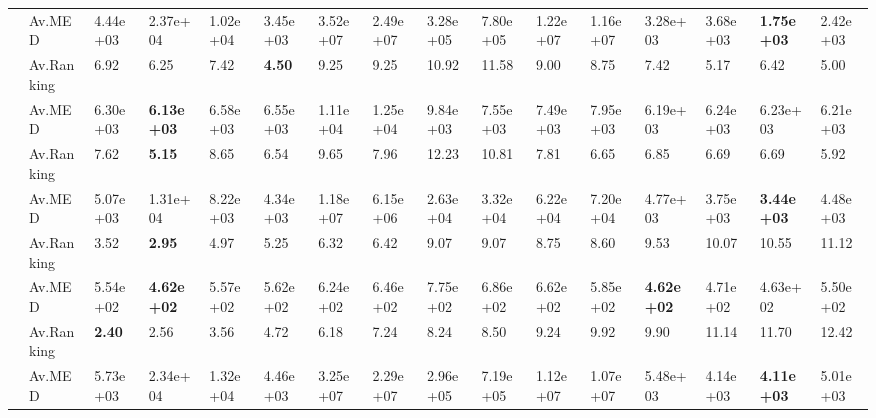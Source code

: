 \begin{ThreePartTable}
{\begin{longtable}{m{0.1cm} C{1.25cm} m{0.88cm} m{0.88cm} m{0.88cm} m{0.88cm} m{0.88cm} m{0.88cm} m{0.88cm} m{0.88cm} m{0.88cm} m{0.88cm} m{0.88cm} m{0.88cm} m{0.88cm} m{0.88cm}}
\midrule
 & Av.MED  & 4.44e+03 & 2.37e+04 & 1.02e+04 & 3.45e+03 & 3.52e+07 & 2.49e+07 & 3.28e+05 & 7.80e+05 & 1.22e+07 & 1.16e+07 & 3.28e+03 & 3.68e+03 & \textbf{1.75e+03} & 2.42e+03 \\
& Av.Ranking  & 6.92 & 6.25 & 7.42 & \textbf{4.50} & 9.25 & 9.25 & 10.92 & 11.58 & 9.00 & 8.75 & 7.42 & 5.17 & 6.42 & 5.00 \\
\midrule
 & Av.MED  & 6.30e+03 & \textbf{6.13e+03} & 6.58e+03 & 6.55e+03 & 1.11e+04 & 1.25e+04 & 9.84e+03 & 7.55e+03 & 7.49e+03 & 7.95e+03 & 6.19e+03 & 6.24e+03 & 6.23e+03 & 6.21e+03 \\
& Av.Ranking  & 7.62 & \textbf{5.15} & 8.65 & 6.54 & 9.65 & 7.96 & 12.23 & 10.81 & 7.81 & 6.65 & 6.85 & 6.69 & 6.69 & 5.92 \\
\midrule
 & Av.MED  & 5.07e+03 & 1.31e+04 & 8.22e+03 & 4.34e+03 & 1.18e+07 & 6.15e+06 & 2.63e+04 & 3.32e+04 & 6.22e+04 & 7.20e+04 & 4.77e+03 & 3.75e+03 & \textbf{3.44e+03} & 4.48e+03 \\
& Av.Ranking  & 3.52 & \textbf{2.95} & 4.97 & 5.25 & 6.32 & 6.42 & 9.07 & 9.07 & 8.75 & 8.60 & 9.53 & 10.07 & 10.55 & 11.12 \\
\midrule
 & Av.MED  & 5.54e+02 & \textbf{4.62e+02} & 5.57e+02 & 5.62e+02 & 6.24e+02 & 6.46e+02 & 7.75e+02 & 6.86e+02 & 6.62e+02 & 5.85e+02 & \textbf{4.62e+02} & 4.71e+02 & 4.63e+02 & 5.50e+02 \\
& Av.Ranking  & \textbf{2.40} & 2.56 & 3.56 & 4.72 & 6.18 & 7.24 & 8.24 & 8.50 & 9.24 & 9.92 & 9.90 & 11.14 & 11.70 & 12.42 \\\midrule
 & Av.MED  & 5.73e+03 & 2.34e+04 & 1.32e+04 & 4.46e+03 & 3.25e+07 & 2.29e+07 & 2.96e+05 & 7.19e+05 & 1.12e+07 & 1.07e+07 & 5.48e+03 & 4.14e+03 & \textbf{4.11e+03} & 5.01e+03 \\

\end{longtable}}
\end{ThreePartTable}
